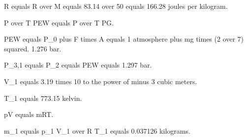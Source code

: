 R equals R over M equals 83.14 over 50 equals 166.28 joules per kilogram.

P over T PEW equals P over T PG.

PEW equals P_0 plus F times A equals 1 atmosphere plus mg times (2 over 7) squared. 1.276 bar.

P_3,1 equals P_2 equals PEW equals 1.297 bar.

V_1 equals 3.19 times 10 to the power of minus 3 cubic meters.

T_1 equals 773.15 kelvin.

pV equals mRT.

m_1 equals p_1 V_1 over R T_1 equals 0.037126 kilograms.